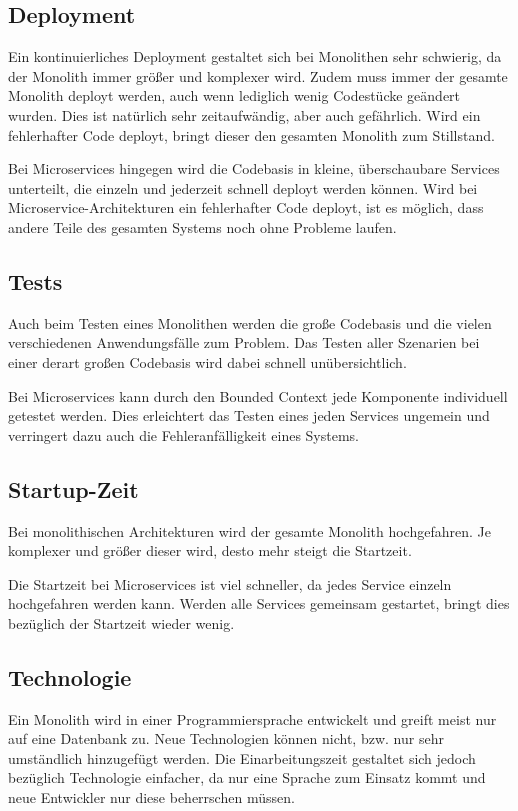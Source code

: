 \subsection{Deployment}
Ein kontinuierliches Deployment gestaltet sich bei Monolithen sehr schwierig, da der Monolith immer größer und komplexer wird. Zudem muss immer der gesamte Monolith deployt werden, auch wenn lediglich wenig Codestücke geändert wurden. Dies ist natürlich sehr zeitaufwändig, aber auch gefährlich. Wird ein fehlerhafter Code deployt, bringt dieser den gesamten Monolith zum Stillstand.

Bei Microservices hingegen wird die Codebasis in kleine, überschaubare Services unterteilt, die einzeln und jederzeit schnell deployt werden können. Wird bei Microservice-Architekturen ein fehlerhafter Code deployt, ist es möglich, dass andere Teile des gesamten Systems noch ohne Probleme laufen.

\subsection{Tests}
Auch beim Testen eines Monolithen werden die große Codebasis und die vielen verschiedenen Anwendungsfälle zum Problem. Das Testen aller Szenarien bei einer derart großen Codebasis wird dabei schnell unübersichtlich.

Bei Microservices kann durch den Bounded Context jede Komponente individuell getestet werden. Dies erleichtert das Testen eines jeden Services ungemein und verringert dazu auch die Fehleranfälligkeit eines Systems.

\subsection{Startup-Zeit}
Bei monolithischen Architekturen wird der gesamte Monolith hochgefahren. Je komplexer und größer dieser wird, desto mehr steigt die Startzeit.

Die Startzeit bei Microservices ist viel schneller, da jedes Service einzeln hochgefahren werden kann. Werden alle Services gemeinsam gestartet, bringt dies bezüglich der Startzeit wieder wenig.

\subsection{Technologie}
Ein Monolith wird in einer Programmiersprache entwickelt und greift meist nur auf eine Datenbank zu. Neue Technologien können nicht, bzw. nur sehr umständlich hinzugefügt werden. Die Einarbeitungszeit gestaltet sich jedoch bezüglich Technologie einfacher, da nur eine Sprache zum Einsatz kommt und neue Entwickler nur diese beherrschen müssen.

